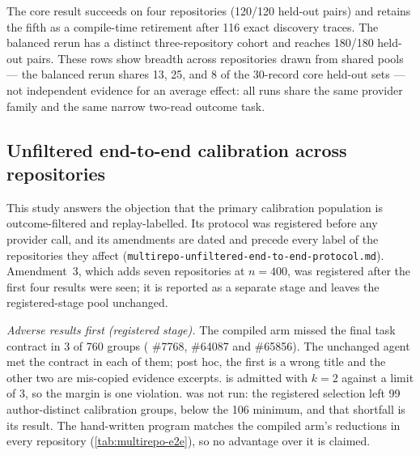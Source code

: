 \begin{table}[t]
  \centering
  \caption{Disaggregated cross-repository outcomes behind
  \cref{sec:res-more}.
  The core protocol uses four completed repositories and one compile-time
  retirement; the balanced rerun changes the selected repositories and class
  mix, so it is reported separately rather than pooled with the core protocol.
  Reductions compare the compiled condition with the paired unchanged baseline.}
  \label{tab:multirepo-disaggregated}
  \footnotesize
  \setlength{\tabcolsep}{3.5pt}
  
\end{table}

The core result succeeds on four repositories (120/120 held-out pairs) and
retains the fifth as a compile-time retirement after 116 exact discovery traces.
The balanced rerun has a distinct three-repository cohort and reaches 180/180
held-out pairs. These rows show breadth across repositories drawn from shared
pools --- the balanced rerun shares 13, 25, and 8 of the 30-record core
held-out sets --- not independent evidence for an average effect: all runs
share the same provider family and the same narrow two-read outcome task.

\subsection{Unfiltered end-to-end calibration across repositories}
\label{app:multirepo-e2e}
This study answers the objection that the primary calibration population is
outcome-filtered and replay-labelled. Its protocol was registered before any
provider call, and its amendments are dated and precede every label of the
repositories they affect (\texttt{multirepo-unfiltered-end-to-end-protocol.md}).
Amendment~3, which adds seven repositories at $n=400$, was registered after the
first four results were seen; it is reported as a separate stage and leaves the
registered-stage pool unchanged.

\emph{Adverse results first (registered stage).} The compiled arm missed the final task contract in 3
of 760 groups ( \#7768, 
\#64087 and \#65856). The unchanged agent met the contract in each of them; post
hoc, the first is a wrong title and the other two are mis-copied evidence excerpts.  is admitted with $k=2$ against
a limit of 3, so the margin is one violation.  was not run: the
registered selection left 99 author-distinct calibration groups, below the 106
minimum, and that shortfall is its result. The hand-written program matches the
compiled arm's reductions in every repository (\cref{tab:multirepo-e2e}), so no advantage
over it is claimed.

